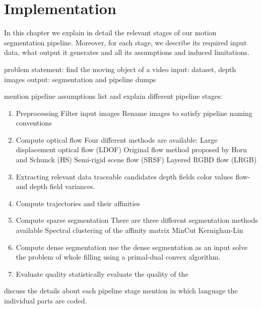 \chapter{Implementation}
In this chapter we explain in detail the relevant stages of our motion segmentation pipeline. Moreover, for each stage, we describe its required input data, what output it generates and all its assumptions and induced limitations. 

problem statement: find the moving object of a video
input: dataset, depth images
output: segmentation and pipeline dumps


mention pipeline assumptions
list and explain different pipeline stages:

\begin{enumerate}
\item Preprocessing
	\subitem Filter input images
	\subitem Rename images to satisfy pipeline naming conventions 
\item Compute optical flow
	\subitem Four different methods are available:
	\subitem Large displacement optical flow (LDOF)
	\subitem Original flow method proposed by Horn and Schunck (HS)
	\subitem Semi-rigid scene flow (SRSF)
	\subitem Layered RGBD flow (LRGB)
\item Extracting relevant data
	\subitem traceable candidates
	\subitem depth fields
	\subitem color values
	\subitem flow-and depth field variances.
\item Compute trajectories and their affinities
\item Compute sparse segmentation
	\subitem There are three different segmentation methods available
	\subitem Spectral clustering of the affinity matrix
	\subitem MinCut
	\subitem Kernighan-Lin 
\item Compute dense segmentation
	\subitem use the dense segmentation as an input solve the problem of whole filling using a primal-dual convex algorithm. 
\item Evaluate quality
	\subitem statistically evaluate the quality of the  
\end{enumerate}

discuss the details about each pipeline stage
mention in which language the individual parts are coded.
